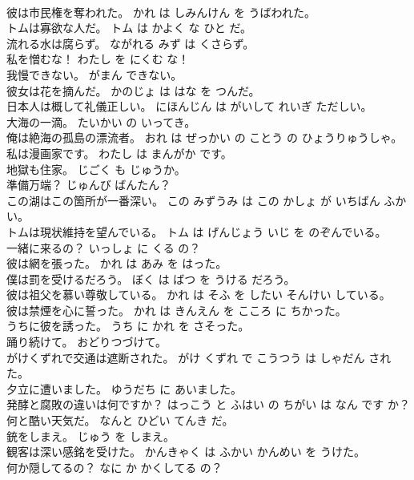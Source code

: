\documentclass[8pt]{extreport}
\begin{document}
\begin{CJK}{UTF8}{min}
\\	彼は市民権を奪われた。	かれ は しみんけん を うばわれた。	
\\	トムは寡欲な人だ。	トム は かよく な ひと だ。	
\\	流れる水は腐らず。	ながれる みず は くさらず。	
\\	私を憎むな！	わたし を にくむ な！	
\\	我慢できない。	がまん できない。	
\\	彼女は花を摘んだ。	かのじょ は はな を つんだ。	
\\	日本人は概して礼儀正しい。	にほんじん は がいして れいぎ ただしい。	
\\	大海の一滴。	たいかい の いってき。	
\\	俺は絶海の孤島の漂流者。	おれ は ぜっかい の ことう の ひょうりゅうしゃ。	
\\	私は漫画家です。	わたし は まんがか です。	
\\	地獄も住家。	じごく も じゅうか。	
\\	準備万端？	じゅんび ばんたん？	
\\	この湖はこの箇所が一番深い。	この みずうみ は この かしょ が いちばん ふかい。	
\\	トムは現状維持を望んでいる。	トム は げんじょう いじ を のぞんでいる。	
\\	一緒に来るの？	いっしょ に くる の？	
\\	彼は網を張った。	かれ は あみ を はった。	
\\	僕は罰を受けるだろう。	ぼく は ばつ を うける だろう。	
\\	彼は祖父を慕い尊敬している。	かれ は そふ を したい そんけい している。	
\\	彼は禁煙を心に誓った。	かれ は きんえん を こころ に ちかった。	
\\	うちに彼を誘った。	うち に かれ を さそった。	
\\	踊り続けて。	おどりつづけて。	
\\	がけくずれで交通は遮断された。	がけ くずれ で こうつう は しゃだん された。	
\\	夕立に遭いました。	ゆうだち に あいました。	
\\	発酵と腐敗の違いは何ですか？	はっこう と ふはい の ちがい は なん です か？	
\\	何と酷い天気だ。	なんと ひどい てんき だ。	
\\	銃をしまえ。	じゅう を しまえ。	
\\	観客は深い感銘を受けた。	かんきゃく は ふかい かんめい を うけた。	
\\	何か隠してるの？	なに か かくしてる の？	

\end{CJK}
\end{document}
